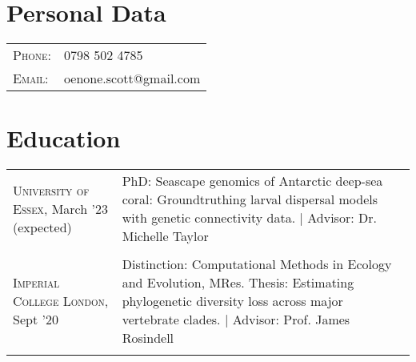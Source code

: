 \documentclass[a4paper,10pt]{article} %
\begin{document}
	
	\pagestyle{empty} %
	
	\par{ %
		
		
		
	
	\section{Personal Data}
	
	\begin{tabular}{ll}
		\textsc{Phone:} & 0798 502 4785 \\
		\textsc{Email:} & oenone.scott@gmail.com
	\end{tabular}






\section{Education}


\begin{tabular}{ L{4cm} L{15cm} }
	\textsc{University of Essex}, March '23 (expected) & PhD: Seascape genomics of Antarctic deep-sea coral: Groundtruthing larval dispersal models with genetic connectivity data. \newline 
	| \small Advisor: Dr. Michelle Taylor \\&\\
	
	\textsc{Imperial College London}, Sept '20  & Distinction: Computational Methods in Ecology and Evolution, MRes. \newline 
	Thesis: Estimating phylogenetic diversity loss across major vertebrate clades. \newline
	| \small Advisor: Prof. James Rosindell\\&\\
	

\end{tabular}}
\end{document}
